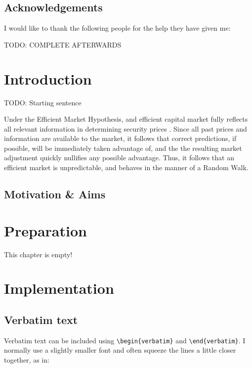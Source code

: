 \documentclass[12pt,a4paper,twoside,openright]{report}
\begin{document}
\medskip
{}

\tableofcontents

\listoffigures

\newpage
\section*{Acknowledgements}

I would like to thank the following people for the help they have given me:

TODO: COMPLETE AFTERWARDS


\pagestyle{headings}

\chapter{Introduction}
TODO: Starting sentence

Under the Efficient Market Hypothesis, and efficient capital market fully reflects
all relevant information in determining security prices \cite{Malkiel89}. Since all past prices and
information are available to the market, it follows that correct predictions, if possible, will be immediately
taken advantage of, and the the resulting market adjustment quickly nullifies any possible advantage. Thus,
it follows that an efficient market is unpredictable, and behaves in the manner of a Random Walk. 

\section{Motivation \& Aims}


\chapter{Preparation}

This chapter is empty!


\chapter{Implementation}

\section{Verbatim text}

Verbatim text can be included using \verb|\begin{verbatim}| and
\verb|\end{verbatim}|. I normally use a slightly smaller font and
often squeeze the lines a little closer together, as in:
\end{document}
